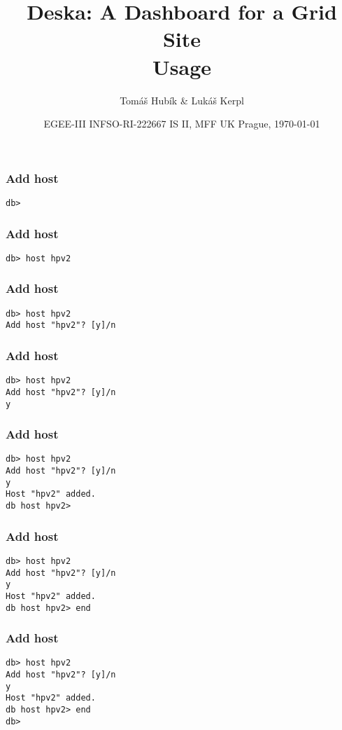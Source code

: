 \documentclass{beamer}
\begin{document}
\title{Deska: A Dashboard for a Grid Site\\
Usage}
\author{Tomáš Hubík \& Lukáš Kerpl}
\date{
   {EGEE-III INFSO-RI-222667}  
\hfill
IS II, MFF UK Prague, \today
}
\begin{frame}
\maketitle
\end{frame}

\begin{frame}[fragile]
\frametitle{Add host}
\begin{lstlisting}
db>
\end{lstlisting}
\end{frame}

\begin{frame}[fragile]
\frametitle{Add host}
\begin{lstlisting}
db> host hpv2
\end{lstlisting}
\end{frame}

\begin{frame}[fragile]
\frametitle{Add host}
\begin{lstlisting}
db> host hpv2
Add host "hpv2"? [y]/n
\end{lstlisting}
\end{frame}

\begin{frame}[fragile]
\frametitle{Add host}
\begin{lstlisting}
db> host hpv2
Add host "hpv2"? [y]/n
y
\end{lstlisting}
\end{frame}

\begin{frame}[fragile]
\frametitle{Add host}
\begin{lstlisting}
db> host hpv2
Add host "hpv2"? [y]/n
y
Host "hpv2" added.
db host hpv2> 
\end{lstlisting}
\end{frame}

\begin{frame}[fragile]
\frametitle{Add host}
\begin{lstlisting}
db> host hpv2
Add host "hpv2"? [y]/n
y
Host "hpv2" added.
db host hpv2> end
\end{lstlisting}
\end{frame}

\begin{frame}[fragile]
\frametitle{Add host}
\begin{lstlisting}
db> host hpv2
Add host "hpv2"? [y]/n
y
Host "hpv2" added.
db host hpv2> end
db>
\end{lstlisting}
\end{frame}
\end{document}
